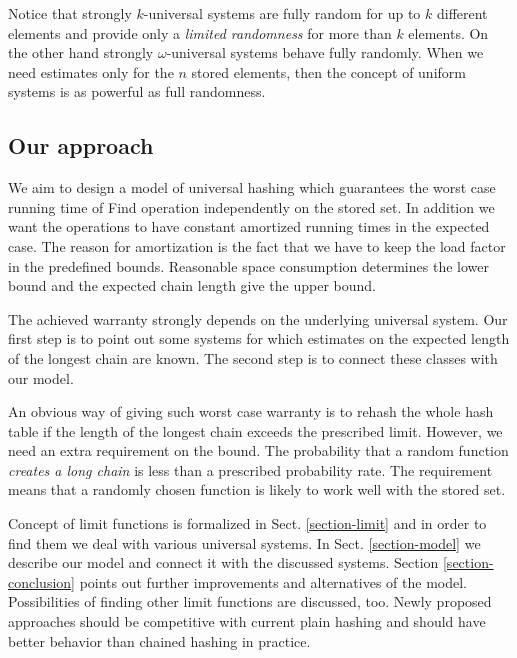 Notice that strongly $k$-universal systems are fully random for up to $k$ different elements and provide only a \emph{limited randomness} for more than $k$ elements. On the other hand strongly $\omega$-universal systems behave fully randomly. When we need estimates only for the $n$ stored elements, then the concept of uniform systems is as powerful as full randomness.

\subsection{Our approach}
We aim to design a model of universal hashing which guarantees the worst case running time of Find operation independently on the stored set. In addition we want the operations to have constant amortized running times in the expected case. The reason for amortization is the fact that we have to keep the load factor in the predefined bounds. Reasonable space consumption determines the lower bound and the expected chain length give the upper bound.

The achieved warranty strongly depends on the underlying universal system. Our first step is to point out some systems for which estimates on the expected length of the longest chain are known. The second step is to connect these classes with our model.

An obvious way of giving such worst case warranty is to rehash the whole hash table if the length of the longest chain exceeds the prescribed limit. However, we need an extra requirement on the bound. The probability that a random function \emph{creates a long chain} is less than a prescribed probability rate. The requirement means that a randomly chosen function is likely to work well with the stored set.

Concept of limit functions is formalized in Sect. \ref{section-limit} and in order to find them we deal with various universal systems. In Sect. \ref{section-model} we describe our model and connect it with the discussed systems. Section \ref{section-conclusion} points out further improvements and alternatives of the model. Possibilities of finding other limit functions are discussed, too. Newly proposed approaches should be competitive with current plain hashing and should have better behavior than chained hashing in practice.
